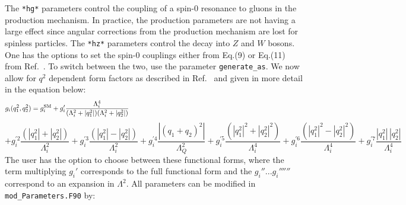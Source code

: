 \documentclass[aps,superscriptaddress,nofootinbib]{revtex4}
\begin{document}
\noindent
The \verb|*hg*| parameters control the coupling of a spin-0 resonance to gluons in the production mechanism.
In practice, the production parameters are not having a large effect since angular corrections from the production mechanism are lost for spinless particles.
The \verb|*hz*| parameters control the decay into $Z$ and $W$ bosons.
One has the options to set the spin-0 couplings either from Eq.(9) or Eq.(11) from Ref.~\cite{Bolognesi:2012}.
To switch between the two, use the parameter \verb|generate_as|.
We now allow for $q^2$ dependent form factors as described in Ref.~\cite{Anderson:2013} and given in more detail in the equation below:
\[
g_i(q_1^2,q_2^2) =
g_i^{\rm SM}
+ g_i' \frac{\Lambda_i^4}{(\Lambda_i^2 + |q_1^2|)(\Lambda_i^2 + |q_2^2|)}
~~~~~~~~~~~~~~~~~~~~~~~~~~~~~~~~~~~~~~~~~~~~~~~~~~~~~~~~~~~~~~~~~~~~~~~~~~~~~~
\]
\[
+ g_i^{\prime 2}  \frac{(|q_1^2|+|q_2^2|)}{\Lambda_i^2}
+ g_i^{\prime 3}  \frac{(|q_1^2|-|q_2^2|)}{\Lambda_i^2}
+ g_i^{\prime 4}  \frac{|(q_1+q_2)^2|}{\Lambda_Q^2}
+ g_i^{\prime 5}  \frac{(|q_1^2|^2+|q_2^2|^2)}{\Lambda_i^4}
+ g_i^{\prime 6}  \frac{(|q_1^2|^2-|q_2^2|^2)}{\Lambda_i^4}
+ g_i^{\prime 7}  \frac{|q_1^2| \, |q_2^2|}{\Lambda_i^4}
\]
\noindent
The user has the option to choose between these functional forms,
where the term multiplying $g_i'$ corresponds to the full functional form and the $g_i''... g_i'''''' $ correspond to an expansion in $\Lambda^2$.
All parameters can be modified in \verb|mod_Parameters.F90| by:
\end{document}
